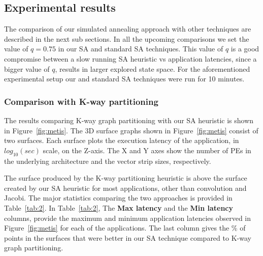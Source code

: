 \subsection{Experimental results}
\label{sec:results}

The comparison of our simulated annealing approach with other techniques
are described in the next sub sections. In all the upcoming comparisons
we set the value of $q=0.75$ in our SA and standard SA techniques. This
value of $q$ is a good compromise between a slow running SA heuristic vs
application latencies, since a bigger value of $q$, results in larger
explored state space. For the aforementioned experimental setup our and
standard SA techniques were run for 10 minutes.

\subsubsection{Comparison with K-way partitioning}
\label{sec:comparison-with-k}

The results comparing K-way graph partitioning with our SA heuristic is
shown in Figure~\ref{fig:metis}. The 3D surface graphs shown in
Figure~\ref{fig:metis} consist of two surfaces. Each surface plots the
execution latency of the application, in $log_{10}(sec)$ scale, on the
Z-axis. The X and Y axes show the number of PEs in the underlying
architecture and the vector strip sizes, respectively.

The surface produced by the K-way partitioning heuristic is above the
surface created by our SA heuristic for most applications, other than
convolution and Jacobi. The major statistics comparing the two
approaches is provided in Table~\ref{tab:2}. In Table~\ref{tab:2}, The
\textbf{Max latency} and the \textbf{Min latency} columns, provide the
maximum and minimum application latencies observed in
Figure~\ref{fig:metis} for each of the applications. The last column
gives the \% of points in the surfaces that were better in our SA
technique compared to K-way graph partitioning.

